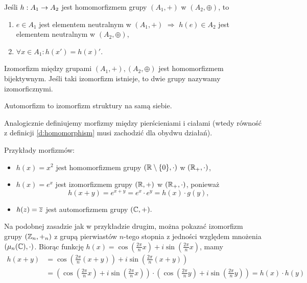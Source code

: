 \documentclass[11pt]{scrartcl}
\begin{document}
    \begin{fact}
        Jeśli $h : A_1 \rightarrow A_2$ jest homomorfizmem grupy $(A_1, +)$ w $(A_2, \oplus)$, to
        \begin{enumerate}
            \item $e \in A_1$ jest elementem neutralnym w $(A_1, +)$ $\Longrightarrow$ $h(e) \in A_2$ jest elementem neutralnym w $(A_2, \oplus)$,
            \item $\forall x \in A_1 : h(x') = h(x)'$.
        \end{enumerate}
    \end{fact}

    \begin{definition}
        Izomorfizm między grupami $(A_1, +), (A_2, \oplus)$ jest homomorfizmem bijektywnym. Jeśli taki izomorfizm istnieje, to dwie grupy nazywamy izomorficznymi.
    \end{definition}

    \begin{definition}
        Automorfizm to izomorfizm struktury na samą siebie.
    \end{definition}

    Analogicznie definiujemy morfizmy między pierścieniami i ciałami (wtedy równość z definicji \ref{d:homomorphism} musi zachodzić dla obydwu działań).

    \begin{example}
        Przykłady morfizmów:
        \begin{itemize}
            \item $h(x) = x^2$ jest homomorfizmem grupy $(\mathbb R \setminus \{0\}, \cdot)$ w $(\mathbb R_+, \cdot)$,
            \item $h(x) = e^x$ jest izomorfizmem grupy $(\mathbb R, +)$ w $(\mathbb R_+, \cdot)$, ponieważ
            $$ h(x + y) = e^{x + y} = e^x \cdot e^y = h(x) \cdot g(y), $$
            \item $h(z) = \overline{z}$ jest automorfizmem grupy $(\mathbb C, +).$
        \end{itemize}
    \end{example}

    Na podobnej zasadzie jak w przykładzie drugim, można pokazać izomorfizm grupy $(\mathbb Z_n, +_n)$ z grupą pierwiastów $n$-tego stopnia z jedności względem mnożenia $(\mu_n(\mathbb C), \cdot)$. Biorąc funkcję $h(x) = \cos(\frac{2\pi}{n}x) + i\sin(\frac{2\pi}{n}x)$, mamy
    \begin{align*} h(x + y) &= \cos(\tfrac{2\pi}{n}(x + y)) + i\sin(\tfrac{2\pi}{n}(x + y)) \\
        &= \left(\cos(\tfrac{2\pi}{n}x) + i\sin(\tfrac{2\pi}{n}x)\right) \cdot \left(\cos(\tfrac{2\pi}{n}y) + i\sin(\tfrac{2\pi}{n}y)\right) = h(x) \cdot h(y)\end{align*}
\end{document}
